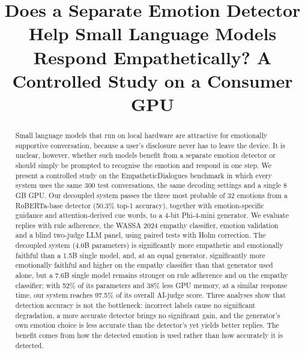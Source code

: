 \documentclass[conference,a4paper]{IEEEtran}
\begin{document}
\title{Does a Separate Emotion Detector Help Small Language Models Respond Empathetically? A Controlled Study on a Consumer GPU}

\author{}

\maketitle

\begin{abstract}
Small language models that run on local hardware are attractive for emotionally supportive conversation, because a user's disclosure never has to leave the device. It is unclear, however, whether such models benefit from a separate emotion detector or should simply be prompted to recognise the emotion and respond in one step. We present a controlled study on the EmpatheticDialogues benchmark in which every system uses the same 300 test conversations, the same decoding settings and a single 8 GB GPU. Our decoupled system passes the three most probable of 32 emotions from a RoBERTa-base detector (50.3\% top-1 accuracy), together with emotion-specific guidance and attention-derived cue words, to a 4-bit Phi-4-mini generator. We evaluate replies with rule adherence, the WASSA 2024 empathy classifier, emotion validation and a blind two-judge LLM panel, using paired tests with Holm correction. The decoupled system (4.0B parameters) is significantly more empathetic and emotionally faithful than a 1.5B single model, and, at an equal generator, significantly more emotionally faithful and higher on the empathy classifier than that generator used alone, but a 7.6B single model remains stronger on rule adherence and on the empathy classifier; with 52\% of its parameters and 38\% less GPU memory, at a similar response time, our system reaches 97.5\% of its overall AI-judge score. Three analyses show that detection accuracy is not the bottleneck: incorrect labels cause no significant degradation, a more accurate detector brings no significant gain, and the generator's own emotion choice is less accurate than the detector's yet yields better replies. The benefit comes from how the detected emotion is used rather than how accurately it is detected.

\end{abstract}
\end{document}
